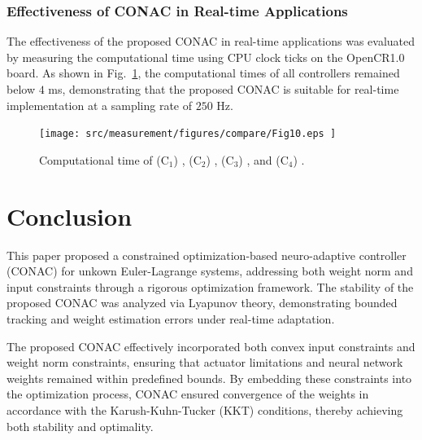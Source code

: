 \documentclass[journal]{IEEEtran}
\begin{document}

\hfill

\subsubsection{Effectiveness of CONAC in Real-time Applications}

The effectiveness of the proposed CONAC in real-time applications was evaluated by measuring the computational time using CPU clock ticks on the OpenCR1.0 board. 
As shown in Fig.~\ref{fig:ctrl:real:result:cmp:time}, the computational times of all controllers remained below $4$ ms, demonstrating that the proposed CONAC is suitable for real-time implementation at a sampling rate of $250$ Hz.

\begin{figure}[t]
    \centering
        \texttt{[image: 
            src/measurement/figures/compare/Fig10.eps
        ]}%
    \caption{
        Computational time of (C$_1$) \protect{}, (C$_2$) \protect{}, (C$_3$) \protect{}, and (C$_4$) \protect{}.
    }
    \label{fig:ctrl:real:result:cmp:time}
  \end{figure}

\section{Conclusion}\label{sec:conclusion}

This paper proposed a constrained optimization-based neuro-adaptive controller (CONAC) for \color{red}unkown\color{black} Euler-Lagrange systems, addressing both weight norm and input constraints through a rigorous optimization framework. 
The stability of the proposed CONAC was analyzed via Lyapunov theory, demonstrating bounded tracking and weight estimation errors under real-time adaptation.

The proposed CONAC effectively incorporated both convex input constraints and weight norm constraints, ensuring that actuator limitations and neural network weights remained within predefined bounds. 
By embedding these constraints into the optimization process, CONAC ensured convergence of the weights in accordance with the Karush-Kuhn-Tucker (KKT) conditions, thereby achieving both stability and optimality.
\end{document}
